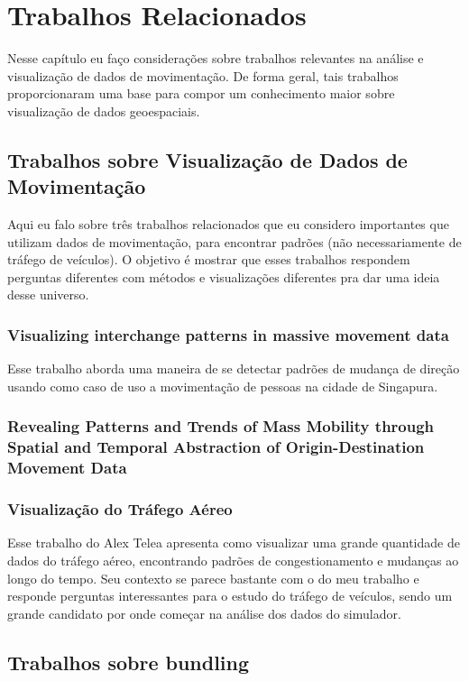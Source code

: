 \chapter{Trabalhos Relacionados}
\label{cap:trabalhos-relacionados}

Nesse capítulo eu faço considerações sobre trabalhos relevantes na análise e
visualização de dados de movimentação.  De forma geral, tais trabalhos
proporcionaram uma base para compor um conhecimento maior sobre visualização de
dados geoespaciais.

\section{Trabalhos sobre Visualização de Dados de Movimentação}

Aqui eu falo sobre três trabalhos relacionados que eu considero importantes que utilizam dados de movimentação,
para encontrar padrões (não necessariamente de tráfego de veículos). O objetivo
é mostrar que esses trabalhos respondem perguntas diferentes com métodos
e visualizações diferentes pra dar uma ideia desse universo.

\subsection{Visualizing interchange patterns in massive movement data}
 Esse trabalho aborda uma maneira de se detectar padrões de mudança de direção
usando como caso de uso a movimentação de pessoas na cidade de Singapura.

\subsection{Revealing Patterns and Trends of Mass Mobility through Spatial
and Temporal Abstraction of Origin-Destination Movement Data}

\subsection{Visualização do Tráfego Aéreo}
 Esse trabalho do Alex Telea apresenta como visualizar uma grande quantidade
de dados do tráfego aéreo, encontrando padrões de congestionamento e mudanças
ao longo do tempo. Seu contexto se parece bastante com o do meu trabalho
e responde perguntas interessantes para o estudo do tráfego de veículos, sendo
um grande candidato por onde começar na análise dos dados do simulador.

\section{Trabalhos sobre bundling}

